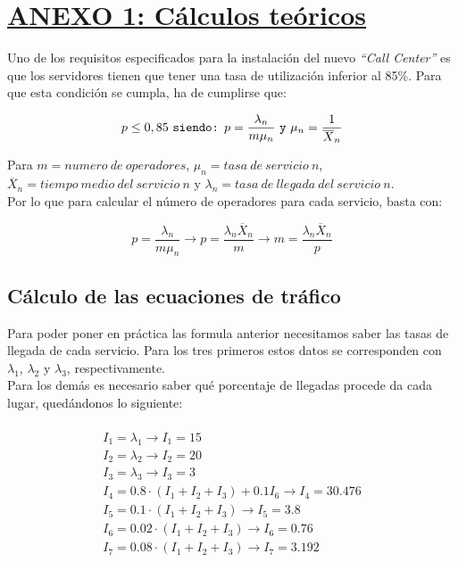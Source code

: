 \section{\textbf{\underline{ANEXO 1: Cálculos teóricos}}}
Uno de los requisitos especificados para la instalación del nuevo \emph{``Call Center''} es que los servidores tienen que tener una tasa de utilización inferior al 85\%. Para que esta condición se cumpla, ha de cumplirse que:

\begin{equation}
p \leq 0,85 \text{ \texttt{siendo:} }
p = \frac{\lambda_{n}}{m\mu_{n}} \text{ \texttt{y} } \mu_{n}= \frac{1}{\overline{X}_{n}}
\end{equation}

Para $m= numero\ de\ operadores$, $\mu_{n} = tasa\ de\ servicio\ n$, $\overline{X}_{n} = tiempo\ medio\ del\ servicio\ n$ y $\lambda_{n} = tasa\ de\ llegada\ del\ servicio\ n$.\\
Por lo que para calcular el número de operadores para cada servicio, basta con:

\begin{equation}
p = \frac{\lambda_{n}}{m\mu_{n}} \rightarrow p = \frac{\lambda_{n}\overline{X}_{n}}{m} \rightarrow m = \frac{\lambda_{n}\overline{X}_{n}}{p}
\end{equation}

\subsection{Cálculo de las ecuaciones de tráfico}
Para poder poner en práctica las formula anterior necesitamos saber las tasas de llegada de cada servicio. Para los tres primeros estos datos se corresponden con $\lambda_{1}$, $\lambda_{2}$ y $\lambda_{3}$, respectivamente.\\

Para los demás es necesario saber qué porcentaje de llegadas procede da cada lugar, quedándonos lo siguiente:

\begin{multline}\\
  I_{1} = \lambda_{1} \rightarrow I_{1} = 15 \\
  I_{2} = \lambda_{2} \rightarrow I_{2} = 20 \\
  I_{3} = \lambda_{3} \rightarrow I_{3} = 3 \\
  I_{4} = 0.8\cdot (I_{1}+I_{2}+I_{3}) + 0.1I_{6} \rightarrow I_{4} = 30.476 \\
  I_{5} = 0.1\cdot (I_{1}+I_{2}+I_{3})  \rightarrow I_{5} = 3.8 \\
  I_{6} = 0.02\cdot (I_{1}+I_{2}+I_{3})  \rightarrow I_{6} = 0.76 \\
  I_{7} = 0.08\cdot (I_{1}+I_{2}+I_{3})  \rightarrow I_{7} = 3.192 \\
  \end{multline}

